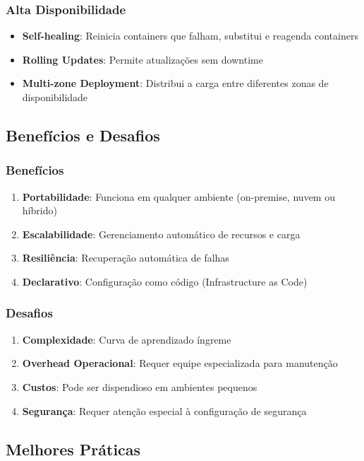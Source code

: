 \subsubsection{Alta Disponibilidade}
\begin{itemize}
\item \textbf{Self-healing}: Reinicia containers que falham, substitui e reagenda containers
\item \textbf{Rolling Updates}: Permite atualizações sem downtime
\item \textbf{Multi-zone Deployment}: Distribui a carga entre diferentes zonas de disponibilidade
\end{itemize}

\subsection{Benefícios e Desafios}
\subsubsection{Benefícios}
\begin{enumerate}
\item \textbf{Portabilidade}: Funciona em qualquer ambiente (on-premise, nuvem ou híbrido)
\item \textbf{Escalabilidade}: Gerenciamento automático de recursos e carga
\item \textbf{Resiliência}: Recuperação automática de falhas
\item \textbf{Declarativo}: Configuração como código (Infrastructure as Code)
\end{enumerate}

\subsubsection{Desafios}
\begin{enumerate}
\item \textbf{Complexidade}: Curva de aprendizado íngreme
\item \textbf{Overhead Operacional}: Requer equipe especializada para manutenção
\item \textbf{Custos}: Pode ser dispendioso em ambientes pequenos
\item \textbf{Segurança}: Requer atenção especial à configuração de segurança
\end{enumerate}

\subsection{Melhores Práticas}

